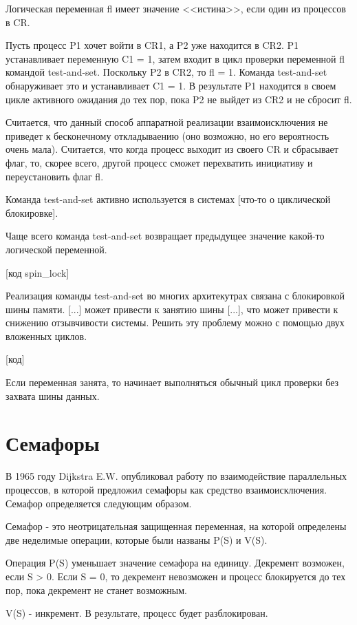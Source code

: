 \documentclass[a4paper, 14pt]{report}
\begin{document}
	Логическая переменная fl имеет значение <<истина>>, если один из процессов в CR.
	
	Пусть процесс P1 хочет войти в CR1, а P2 уже находится в CR2. P1 устанавливает переменную C1 = 1, затем входит в цикл проверки переменной fl командой test-and-set. Поскольку P2 в CR2, то fl = 1. Команда test-and-set обнаруживает это и устанавливает C1 = 1. В результате P1 находится в своем цикле активного ожидания до тех пор, пока P2 не выйдет из CR2 и не сбросит fl.
	
	Считается, что данный способ аппаратной реализации взаимоисключения не приведет к бесконечному откладываению (оно возможно, но его вероятность очень мала). Считается, что когда процесс выходит из своего CR и сбрасывает флаг, то, скорее всего, другой процесс сможет перехватить инициативу и переустановить флаг fl.
	
	Команда test-and-set активно используется в системах [что-то о циклической блокировке].
	
	Чаще всего команда test-and-set возвращает предыдущее значение какой-то логической переменной.
	
	[код spin\_lock]
	
	Реализация команды test-and-set во многих архитекутрах связана с блокировкой шины памяти. [...] может привести к занятию шины [...], что может привести к снижению отзывчивости системы. Решить эту проблему можно с помощью двух вложенных циклов.
	
	[код]
	
	Если переменная занята, то начинает выполняться обычный цикл проверки без захвата шины данных.
	
	\section*{Семафоры}
	
	В 1965 году Dijkstra E.W. опубликовал работу по взаимодействие параллельных процессов, в которой предложил семафоры как средство взаимоисключения. Семафор определяется следующим образом.
	
	Семафор - это неотрицательная защищенная переменная, на которой определены две неделимые операции, которые были названы P(S) и V(S).
	
	Операция P(S) уменьшает значение семафора на единицу. Декремент возможен, если S > 0. Если S = 0, то декремент невозможен и процесс блокируется до тех пор, пока декремент не станет возможным.
	
	V(S) - инкремент. В результате, процесс будет разблокирован.
	
\end{document}
